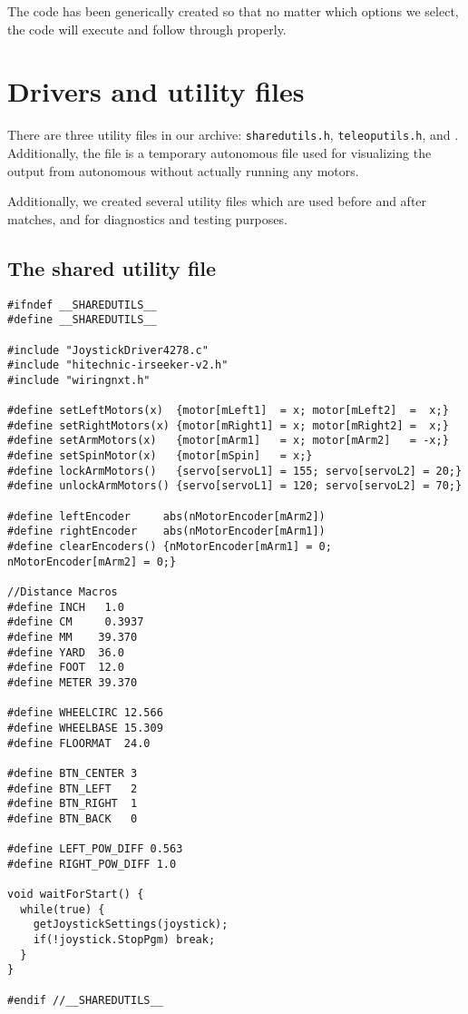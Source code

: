 The code has been generically created so that no matter which options we select, the code will execute and follow through properly.

\section{Drivers and utility files}
There are three utility files in our archive: \lstinline{sharedutils.h}, \lstinline{teleoputils.h}, and . Additionally, the file  is a temporary autonomous file used for visualizing the output from autonomous without actually running any motors.

Additionally, we created several utility files which are used before and after matches, and for diagnostics and testing purposes.

\subsection{The shared utility file}
\begin{lstlisting}
#ifndef __SHAREDUTILS__
#define __SHAREDUTILS__

#include "JoystickDriver4278.c"
#include "hitechnic-irseeker-v2.h"
#include "wiringnxt.h"

#define setLeftMotors(x)  {motor[mLeft1]  = x; motor[mLeft2]  =  x;}
#define setRightMotors(x) {motor[mRight1] = x; motor[mRight2] =  x;}
#define setArmMotors(x)   {motor[mArm1]   = x; motor[mArm2]   = -x;}
#define setSpinMotor(x)   {motor[mSpin]   = x;}
#define lockArmMotors()   {servo[servoL1] = 155; servo[servoL2] = 20;}
#define unlockArmMotors() {servo[servoL1] = 120; servo[servoL2] = 70;}

#define leftEncoder     abs(nMotorEncoder[mArm2])
#define rightEncoder    abs(nMotorEncoder[mArm1])
#define clearEncoders() {nMotorEncoder[mArm1] = 0; nMotorEncoder[mArm2] = 0;}

//Distance Macros
#define INCH   1.0
#define CM     0.3937
#define MM    39.370
#define YARD  36.0
#define FOOT  12.0
#define METER 39.370

#define WHEELCIRC 12.566
#define WHEELBASE 15.309
#define FLOORMAT  24.0

#define BTN_CENTER 3
#define BTN_LEFT   2
#define BTN_RIGHT  1
#define BTN_BACK   0

#define LEFT_POW_DIFF 0.563
#define RIGHT_POW_DIFF 1.0

void waitForStart() {
  while(true) {
    getJoystickSettings(joystick);
    if(!joystick.StopPgm) break;
  }
}

#endif //__SHAREDUTILS__
\end{lstlisting}

